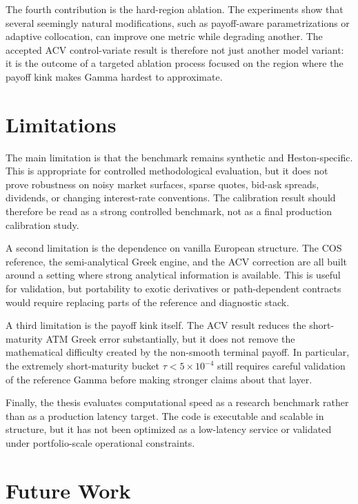 The fourth contribution is the hard-region ablation. The experiments show that several seemingly natural modifications, such as payoff-aware parametrizations or adaptive collocation, can improve one metric while degrading another. The accepted ACV control-variate result is therefore not just another model variant: it is the outcome of a targeted ablation process focused on the region where the payoff kink makes Gamma hardest to approximate.

\section{Limitations}

The main limitation is that the benchmark remains synthetic and Heston-specific. This is appropriate for controlled methodological evaluation, but it does not prove robustness on noisy market surfaces, sparse quotes, bid-ask spreads, dividends, or changing interest-rate conventions. The calibration result should therefore be read as a strong controlled benchmark, not as a final production calibration study.

A second limitation is the dependence on vanilla European structure. The COS reference, the semi-analytical Greek engine, and the ACV correction are all built around a setting where strong analytical information is available. This is useful for validation, but portability to exotic derivatives or path-dependent contracts would require replacing parts of the reference and diagnostic stack.

A third limitation is the payoff kink itself. The ACV result reduces the short-maturity ATM Greek error substantially, but it does not remove the mathematical difficulty created by the non-smooth terminal payoff. In particular, the extremely short-maturity bucket \(\tau<5\times10^{-4}\) still requires careful validation of the reference Gamma before making stronger claims about that layer.

Finally, the thesis evaluates computational speed as a research benchmark rather than as a production latency target. The code is executable and scalable in structure, but it has not been optimized as a low-latency service or validated under portfolio-scale operational constraints.

\section{Future Work}

